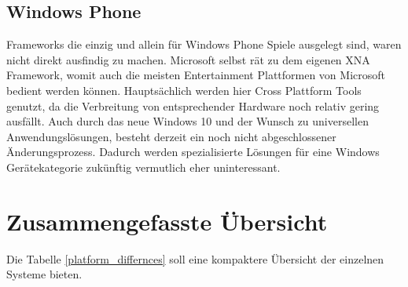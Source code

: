 \subsection{Windows Phone}
Frameworks die einzig und allein für Windows Phone Spiele ausgelegt sind, waren nicht direkt ausfindig zu machen. Microsoft selbst rät zu dem eigenen XNA Framework, womit auch die meisten Entertainment Plattformen von Microsoft bedient werden können. Hauptsächlich werden hier Cross Plattform Tools genutzt, da die Verbreitung von entsprechender Hardware noch relativ gering ausfällt. Auch durch das neue Windows 10 und der Wunsch zu universellen Anwendungslösungen, besteht derzeit ein noch nicht abgeschlossener Änderungsprozess. Dadurch werden spezialisierte Lösungen für eine Windows Gerätekategorie zukünftig vermutlich eher uninteressant.


\section{Zusammengefasste Übersicht}
Die Tabelle \ref{platform_differnces} soll eine kompaktere Übersicht der einzelnen Systeme bieten.



